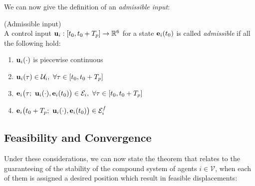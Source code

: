 We can now give the definition of an \textit{admissible input}:

\begin{bw_box}
\begin{definition} (Admissible input)\\

  A control input $\bm{\mathbf{u}}_i : [t_0, t_0 + T_p] \to \mathbb{R}^6$ for a state
  $\bm{\mathbf{e}}_i(t_0)$ is called \textit{admissible} if all the following hold:

  \begin{enumerate}
    \item $\bm{\mathbf{u}}_i(\cdot)$ is piecewise continuous
    \item $\vect{u}_i(\tau) \in \mathcal{U}_i,\ \forall \tau \in [t_0, t_0 + T_p]$
    \item $\vect{e}_i\big(\tau;\ \vect{u}_i(\cdot), \vect{e}_i(t_0)\big) \in \mathcal{E}_i,\ \forall \tau \in [t_0, t_0 + T_p]$
    \item $\vect{e}_i\big(t_0 + T_p;\ \vect{u}_i(\cdot), \vect{e}_i(t_0)\big) \in \mathcal{E}_i^f$
  \end{enumerate}

\end{definition}
\end{bw_box}


\subsection{Feasibility and Convergence}

Under these considerations, we can now state the theorem that relates to
the guaranteeing of the stability of the compound system of agents
$i \in \mathcal{V}$, when each of them is assigned a desired
position which result in feasible displacements:\\

